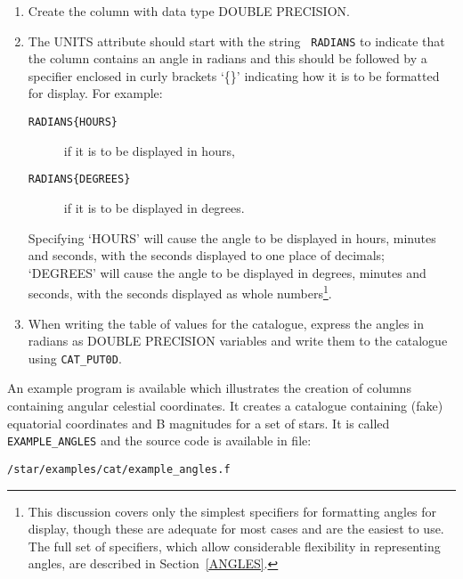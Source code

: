 \begin{enumerate}

  \item Create the column with data type DOUBLE PRECISION.

  \item The UNITS attribute should start with the string {\tt 
   RADIANS} to indicate that the column contains an angle in 
   radians and this should be followed by a specifier enclosed in 
   curly brackets `\{\}' indicating how it is to be formatted for 
   display. For example:

  \begin{description}

    \item[{\tt RADIANS\{HOURS\} }] if it is to be displayed in 
     hours,

    \item[{\tt RADIANS\{DEGREES\} }] if it is to be displayed in 
     degrees.

  \end{description}

   Specifying `HOURS' will cause the angle to be displayed in 
   hours, minutes and seconds, with the seconds displayed to one 
   place of decimals; `DEGREES' will cause the angle to be 
   displayed in degrees, minutes and seconds, with the seconds 
   displayed as whole numbers\footnote{This discussion covers only 
   the simplest specifiers for formatting angles for display, 
   though these are adequate for most cases and are the easiest to 
   use. The full set of specifiers, which allow considerable 
   flexibility in representing angles, are described in 
   Section~\ref{ANGLES}.}.

  \item When writing the table of values for the catalogue, 
   express the angles in radians as DOUBLE PRECISION variables and 
   write them to the catalogue using {\tt CAT\_PUT0D}.

\end{enumerate}

An example program is available which illustrates the creation 
of columns containing angular celestial coordinates. It creates 
a catalogue containing (fake) equatorial coordinates and B 
magnitudes for a set of stars. It is called {\tt EXAMPLE\_ANGLES} and
the source code is available in file:

\begin{center}
{\tt /star/examples/cat/example\_angles.f}
\end{center}

